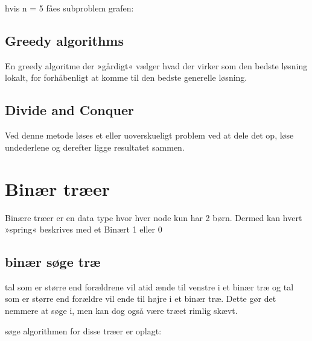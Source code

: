\documentclass[letterpaper,10pt,danish]{sphinxmanual}
\begin{document}
\sphinxAtStartPar
hvis n = 5 fåes subproblem grafen:

\sphinxAtStartPar
{}


\subsection{Greedy algorithms}
\label{\detokenize{Algorithmer/Dynamic:greedy-algorithms}}
\sphinxAtStartPar
En greedy algoritme der »gårdigt« vælger hvad der virker som den bedste løsning lokalt, for forhåbenligt at komme til den bedste generelle løsning.


\subsection{Divide and Conquer}
\label{\detokenize{Algorithmer/Dynamic:divide-and-conquer}}
\sphinxAtStartPar
Ved denne metode løses et eller uoverskueligt problem ved at dele det op, løse undederlene og derefter ligge resultatet sammen.

\sphinxstepscope


\section{Binær træer}
\label{\detokenize{Algorithmer/BinaryTrees:binaer-traeer}}\label{\detokenize{Algorithmer/BinaryTrees::doc}}
\sphinxAtStartPar
Binære træer er en data type hvor hver node kun har 2 børn. Dermed kan hvert »spring« beskrives med et Binært 1 eller 0

\sphinxAtStartPar
{}


\subsection{binær søge træ}
\label{\detokenize{Algorithmer/BinaryTrees:binaer-soge-trae}}
\sphinxAtStartPar
tal som er større end forældrene vil atid ænde til venstre i et binær træ og tal som er større end forældre vil ende til højre i et binær træ. Dette gør det nemmere at søge i, men kan dog også være træet rimlig skævt.

\sphinxAtStartPar
søge algorithmen for disse træer er oplagt:
\end{document}
